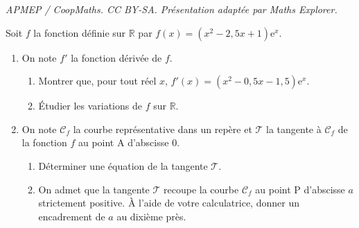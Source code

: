 \documentclass[10pt]{article}
\providecommand{\R}{\mathbb{R}}
\providecommand{\e}{{\mathrm{e}}}
\begin{document}
\noindent\textit{APMEP / CoopMaths. CC BY-SA. Présentation adaptée par Maths Explorer.}\par\medskip
\medskip

Soit $f$ la fonction définie sur $\R$ par $f(x)=(x^2-2,5x+1) \e^x$.
\begin{enumerate}
\item  On note $f'$ la fonction dérivée de $f$.
\begin{enumerate}
\item  Montrer que, pour tout réel $x$, $f'(x)=(x^2-0,5x-1,5)\e^x$.
\item Étudier les variations de $f$ sur  $\R$.
\end{enumerate}
\item On note $\mathcal{C}_f$ la courbe représentative dans un repère et $\mathcal{T}$ la tangente à $\mathcal{C}_f$ de la fonction $f$ au point A d'abscisse 0.
\begin{enumerate}
\item Déterminer une équation de la tangente $\mathcal{T}$.
\item On admet que la tangente $\mathcal{T}$ recoupe la courbe $\mathcal{C}_f$ au point P d'abscisse $a$ strictement positive. À l'aide de votre calculatrice, donner un encadrement de $a$ au dixième près.
\end{enumerate}
\end{enumerate}

\vspace{0,5cm}
\end{document}
